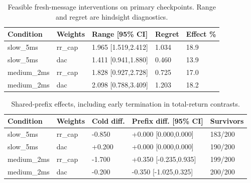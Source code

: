 \begin{table}[htbp]\centering\scriptsize
\caption{Feasible fresh-message interventions on primary checkpoints. Range and regret are hindsight diagnostics.}\label{tab:new_fresh}
\begin{tabular}{lllll}\toprule
Condition & Weights & Range [95\% CI] & Regret & Effect \%\\\midrule
slow\_5ms & rr\_cap & 1.965 [1.519,2.412] & 1.034 & 18.9\\
slow\_5ms & dac & 1.411 [0.941,1.880] & 0.460 & 13.9\\
medium\_2ms & rr\_cap & 1.828 [0.927,2.728] & 0.725 & 17.0\\
medium\_2ms & dac & 2.098 [0.788,3.409] & 1.203 & 18.2\\
\bottomrule\end{tabular}\end{table}
\begin{table}[htbp]\centering\scriptsize
\caption{Shared-prefix effects, including early termination in total-return contrasts.}\label{tab:new_prefix}
\begin{tabular}{lllll}\toprule
Condition & Weights & Cold diff. & Prefix diff. [95\% CI] & Survivors\\\midrule
slow\_5ms & rr\_cap & -0.850 & +0.000 [0.000,0.000] & 183/200\\
slow\_5ms & dac & +0.200 & +0.000 [0.000,0.000] & 190/200\\
medium\_2ms & rr\_cap & -1.700 & +0.350 [-0.235,0.935] & 199/200\\
medium\_2ms & dac & -0.200 & -0.350 [-1.025,0.325] & 200/200\\
\bottomrule\end{tabular}\end{table}
